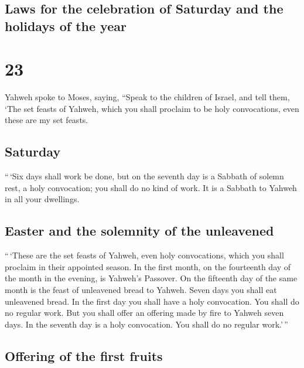 \hypertarget{laws-for-the-celebration-of-saturday-and-the-holidays-of-the-year}{%
\subsection{Laws for the celebration of Saturday and the holidays of the
year}\label{laws-for-the-celebration-of-saturday-and-the-holidays-of-the-year}}

\hypertarget{section-22}{%
\section{23}\label{section-22}}

 Yahweh spoke to Moses, saying,  ``Speak to
the children of Israel, and tell them, `The set feasts of Yahweh, which
you shall proclaim to be holy convocations, even these are my set
feasts.

\hypertarget{saturday}{%
\subsection{Saturday}\label{saturday}}

 ``\,`Six days shall work be done, but on the seventh day
is a Sabbath of solemn rest, a holy convocation; you shall do no kind of
work. It is a Sabbath to Yahweh in all your dwellings.

\hypertarget{easter-and-the-solemnity-of-the-unleavened}{%
\subsection{Easter and the solemnity of the
unleavened}\label{easter-and-the-solemnity-of-the-unleavened}}

 ``\,`These are the set feasts of Yahweh, even holy
convocations, which you shall proclaim in their appointed season.
 In the first month, on the fourteenth day of the month in
the evening, is Yahweh's Passover.  On the fifteenth day
of the same month is the feast of unleavened bread to Yahweh. Seven days
you shall eat unleavened bread.  In the first day you
shall have a holy convocation. You shall do no regular work.
 But you shall offer an offering made by fire to Yahweh
seven days. In the seventh day is a holy convocation. You shall do no
regular work.'\,''

\hypertarget{offering-of-the-first-fruits}{%
\subsection{Offering of the first
fruits}\label{offering-of-the-first-fruits}}

